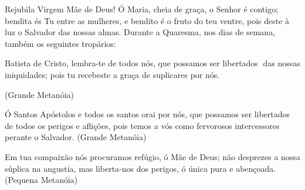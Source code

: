 \documentclass{subfiles}
\begin{document}
Rejubila Virgem Mãe de Deus! Ó Maria, cheia de graça, o Senhor é
contigo; bendita és Tu entre as mulheres, e bendito é o fruto do teu ventre,
pois deste à luz o Salvador das nossas almas. Durante a Quaresma, nos dias de
semana, também os seguintes tropários:

\doxology{}

Batista de Cristo, lembra-te de todos nós, que possamos ser libertados
das nossas iniquidades; pois tu recebeste a graça de suplicares por nós.

(Grande Metanóia)

\nowandever{}

Ó Santos Apóstolos e todos os santos orai por nós, que possamos ser libertados
de todos os perigos e aflições, pois temos a vós como fervorosos intercessores
perante o Salvador. (Grande Metanóia)

Em tua compaixão nós procuramos refúgio, ó Mãe de Deus; não desprezes a nossa
súplica na angustia, mas liberta-nos dos perigos, ó única pura e abençoada.
(Pequena Metanóia)
\end{document}
